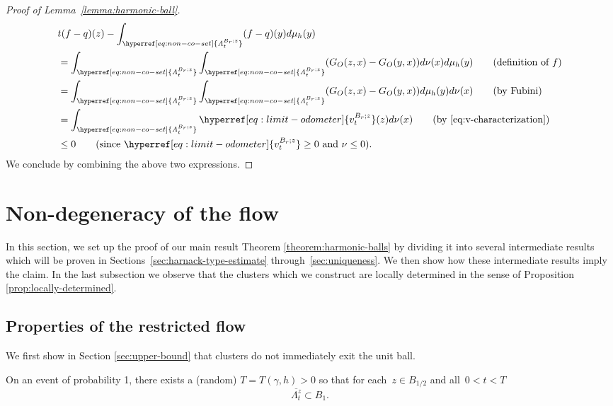 \documentclass[12pt]{amsart}
\numberwithin{equation}{section}
\newcommand{\cluster}[2]{\hyperref[eq:non-co-set]{\mathit{\Lambda}^{#1}_{#2}}}
\newcommand{\odometer}[2]{\hyperref[eq:limit-odometer]{v^{#1}_{#2}}}
\begin{document}
\begin{proof}[Proof of Lemma~\ref{lemma:harmonic-ball}]
\begin{align*}
		&t (f-q)(z) - \int_{{{\cluster{B_r;z}{t}}}}(f-q)(y) d \mu_h(y)  \\
		&=\int_{{{\cluster{B_r;z}{t}}}} \int_{{{\cluster{B_r;z}{t}}}} (G_{O}(z,x) - G_{O}(y,x)) d \nu(x) d \mu_h(y)  \qquad \mbox{(definition of $f$)} \\
		&= \int_{{{\cluster{B_r;z}{t}}}} \int_{{{\cluster{B_r;z}{t}}}} (G_{O}(z,x) - G_{O}(y,x)) d \mu_h(y) d \nu(x) \qquad \mbox{(by Fubini)} \\
		&= \int_{{{\cluster{B_r;z}{t}}}} \odometer{B_r;z}{t}(z) d \nu(x)  \qquad \mbox{(by \eqref{eq:v-characterization}) } \\
		&\leq 0 \qquad \mbox{(since $\odometer{B_r;z}{t} \geq 0$ and $\nu \leq 0$)}.
		\end{align*}		
		We conclude by combining the above two expressions.
	\end{proof}	
	
	
	
	
	
	
	
	
	
	
	
	
	
	
	
	\section{Non-degeneracy of the flow} \label{sec:non-degenerate}
	
	
	In this section, we set up the proof of our main result Theorem \ref{theorem:harmonic-balls}
	by dividing it into several intermediate results which will be proven in Sections~\ref{sec:harnack-type-estimate} through~\ref{sec:uniqueness}. We then show how these intermediate results imply the claim. 
	In the last subsection we observe that the clusters which we construct are locally determined in the sense of Proposition \ref{prop:locally-determined}. 
	
	\subsection{Properties of the restricted flow}
	
	We first show in Section \ref{sec:upper-bound} that clusters do not immediately exit the unit ball.
	\begin{prop} \label{prop:upper-bound}
		On an event of probability 1, there exists a (random) $T = T(\gamma, h) > 0$ so that for each~$z \in B_{1/2}$ 
		and all~$0 < t < T$
		\begin{equation}
		\overline{{{\cluster{z}{t}}}} \subset B_1.
		\end{equation}
	\end{prop}
	
\end{document}
